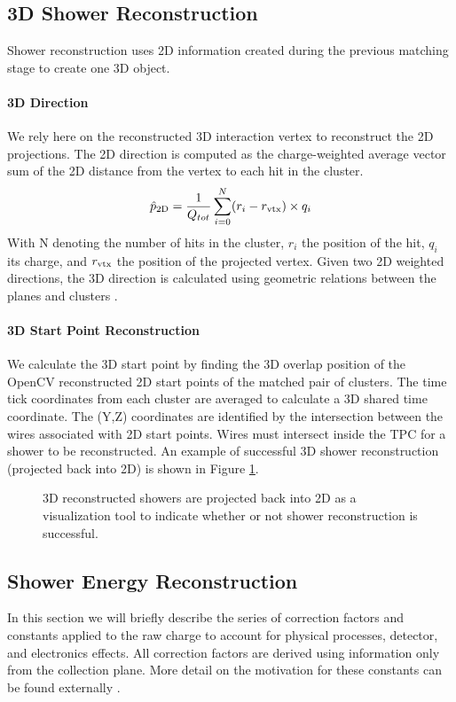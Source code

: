 \subsection{3D Shower Reconstruction}
Shower reconstruction uses 2D information created during the previous matching stage to create one 3D object. 
\paragraph{3D Direction}  We rely here on the reconstructed 3D interaction vertex to reconstruct the 2D projections. The 2D direction is computed as the charge-weighted average vector sum of the 2D distance from the vertex to each hit in the cluster.
\begin{equation}
  \hat{p}_{\rm 2D} = \frac{1}{Q_{tot}} \sum_{i=0}^{N} (r_i - r_{\rm vtx}) \times q_i 
\end{equation}
With N denoting the number of hits in the cluster, $r_i$ the position of the hit, $q_i$ its charge, and $r_{\rm vtx}$ the position of the projected vertex. Given two 2D weighted directions, the 3D direction is calculated using geometric relations between the planes and clusters \cite{bib:larliteGeoHelper}. 

\paragraph{3D Start Point Reconstruction} We calculate the 3D start point by finding the 3D overlap position of the OpenCV reconstructed 2D start points of the matched pair of clusters. The time tick coordinates from each cluster are averaged to calculate a 3D shared time coordinate. The (Y,Z) coordinates are identified by the intersection between the wires associated with 2D start points.  Wires must intersect inside the TPC for a shower to be reconstructed.  An example of successful 3D shower reconstruction (projected back into 2D) is shown in Figure \ref{fig:showers}.

\begin{figure}[h!] %
\centering
{}
\caption{3D reconstructed showers are projected back into 2D as a visualization tool to indicate whether or not shower reconstruction is successful. }
\label{fig:showers}
\end{figure}

\subsection{Shower Energy Reconstruction}
\label{sec:ereco}
\par In this section we will briefly describe the series of correction factors and constants applied to the raw charge to account for physical processes, detector, and electronics effects. All correction factors are derived using information only from the collection plane.  More detail on the motivation for these constants can be found externally \cite{bib:davidc_energycalibration}\cite{bib:davidc_recomb}.

